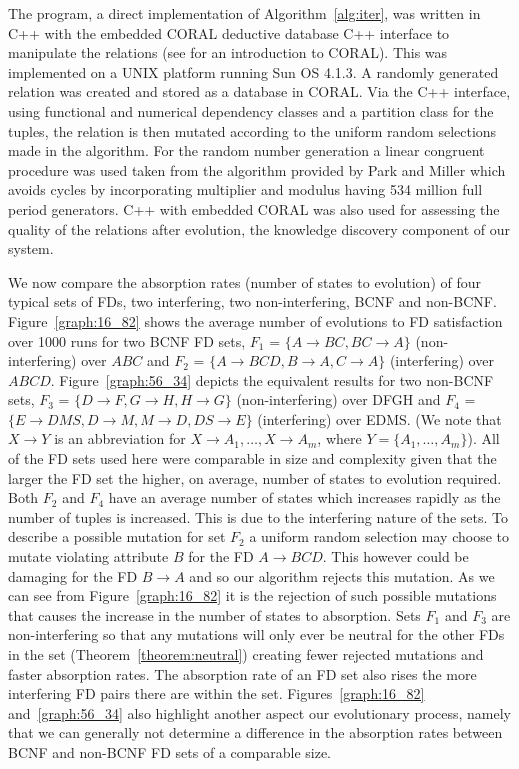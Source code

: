 \medskip


The program, a direct implementation of Algorithm~\ref{alg:iter},
 was written in C++ with the embedded CORAL deductive
database C++ interface to manipulate the relations (see
\cite{rss92} for an introduction to CORAL). This was
implemented on a UNIX platform running Sun OS 4.1.3. A randomly
generated relation was created and stored as a database in CORAL.
Via the C++ interface, using functional and numerical dependency
classes and a partition class for the tuples, the relation 
 is then mutated according
to the uniform random selections made in the algorithm. For the random
number generation a linear congruent procedure was used taken
from the algorithm provided by Park and Miller \cite{pm88} which
avoids cycles by incorporating multiplier and modulus
having 534 million full period generators. C++ with
embedded CORAL was also used for assessing the quality of
the relations after evolution, the knowledge discovery component
of our system.

\medskip

We now compare the absorption rates (number of states to
evolution) of four typical sets of FDs, two
interfering, two non-interfering, BCNF and non-BCNF. Figure~\ref{graph:16_82}
shows the average number of evolutions to FD satisfaction over 1000 runs for
two BCNF FD sets, $F_1$ = $\{ A \to BC, BC \to A \}$ (non-interfering)
over $ABC$ and 
$F_2$ = $\{ A \to BCD, B \to A, C \to A \}$ (interfering) over $ABCD$.
 Figure~\ref{graph:56_34} depicts the equivalent results for two non-BCNF sets, $F_3$ = 
$\{ D \to F, G \to H, H \to G \}$ (non-interfering) over DFGH and
$F_4$ = $\{E \to DMS, D \to M, M \to D, DS \to E \}$ (interfering) over EDMS.
(We note that $X \to Y$ is an abbreviation for $X \to A_1, \ldots, X \to A_m$,
where $Y = \{A_1, \ldots, A_m \}$).
  All of the
FD sets used here were comparable in size and complexity given that the larger
the FD set the higher, on average, number of states to evolution required.
Both $F_2$ and $F_4$ have an average number of states which increases
rapidly as the number of tuples is increased. This is due to the
interfering nature of the sets. To describe a possible mutation
for set $F_2$ a uniform random selection may choose to mutate violating
attribute $B$ for the FD $A \to BCD$. This however could be damaging for
the FD $B \to A$ and so our algorithm rejects this mutation. As we
can see from Figure~\ref{graph:16_82} it is the rejection of such
possible mutations that causes the increase in the number of states
to absorption. Sets $F_1$ and $F_3$ are non-interfering so that
any mutations will only ever be neutral for the other FDs in the set 
(Theorem~\ref{theorem:neutral}) creating fewer rejected mutations
and faster absorption rates. The absorption rate of an FD set also
rises the more interfering FD pairs there are within
the set.
Figures~\ref{graph:16_82} and~\ref{graph:56_34} also highlight another
aspect our evolutionary process, namely that we can generally not determine
 a difference in the 
absorption rates between BCNF and non-BCNF FD sets of a comparable
size. \\


